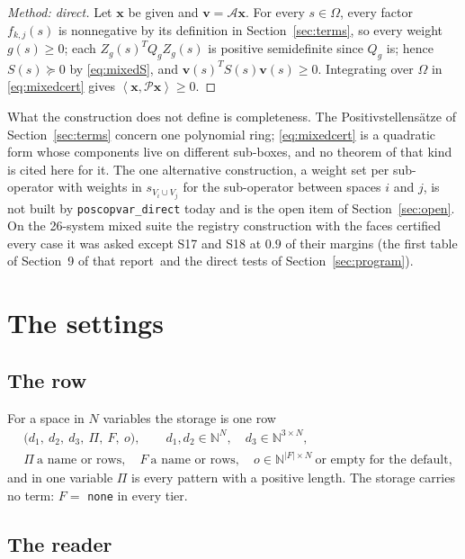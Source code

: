 \documentclass[12pt]{article}
\newcommand{\N}{\mathbb{N}}
\newcommand{\mcl}[1]{\mathcal{#1}}
\newcommand{\mbf}[1]{\mathbf{#1}}
\newcommand{\ip}[2]{\left\langle #1,#2\right\rangle}
\newcommand{\code}[1]{\texttt{#1}}
\newcommand{\liftref}{the first table of Section~9 of that report}
\theoremstyle{plain}
\theoremstyle{definition}
\theoremstyle{remark}
\begin{document}
\begin{proof}[Method: direct]
Let $\mbf x$ be given and $\mbf v=\mcl A\mbf x$. For every $s\in\Omega$, every factor $f_{k,j}(s)$ is nonnegative by its definition in Section~\ref{sec:terms}, so every weight $g(s)\ge0$; each $Z_g(s)^TQ_gZ_g(s)$ is positive semidefinite since $Q_g$ is; hence $S(s)\succeq0$ by \eqref{eq:mixedS}, and $\mbf v(s)^TS(s)\mbf v(s)\ge0$. Integrating over $\Omega$ in \eqref{eq:mixedcert} gives $\ip{\mbf x}{\mcl P\mbf x}\ge0$.
\end{proof}

What the construction does not define is completeness. The Positivstellens\"atze of Section~\ref{sec:terms} concern one polynomial ring; \eqref{eq:mixedcert} is a quadratic form whose components live on different sub-boxes, and no theorem of that kind is cited here for it. The one alternative construction, a weight set per sub-operator with weights in $s_{V_i\cup V_j}$ for the sub-operator between spaces $i$ and $j$, is not built by \code{poscopvar\_direct} today and is the open item of Section~\ref{sec:open}. On the 26-system mixed suite the registry construction with the faces certified every case it was asked except S17 and S18 at $0.9$ of their margins (\liftref\ and the direct tests of Section~\ref{sec:program}).

\section{The settings}\label{sec:settings}

\subsection{The row}

For a space in $N$ variables the storage is one row
\[
\begin{aligned}
&\bigl(d_1,\ d_2,\ d_3,\ \Pi,\ F,\ o\bigr),\qquad d_1,d_2\in\N^N,\quad d_3\in\N^{3\times N},\\
&\Pi\ \text{a name or rows},\quad F\ \text{a name or rows},\quad o\in\N^{|F|\times N}\ \text{or empty for the default},
\end{aligned}
\]
and in one variable $\Pi$ is every pattern with a positive length. The storage carries no term: $F=$ \code{none} in every tier.



\subsection{The reader}\label{sec:reader}
\end{document}
